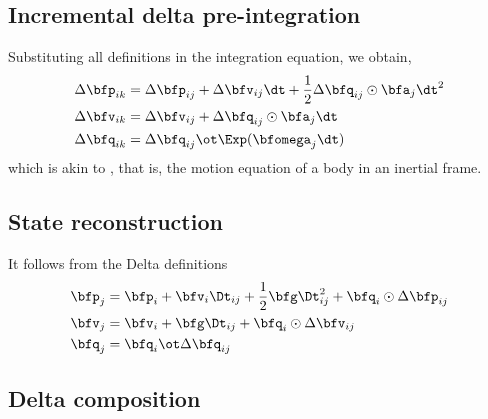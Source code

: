 \subsection{Incremental delta pre-integration}
%
Substituting all definitions in the integration equation, we obtain,
%
\begin{align}\label{equ:g_second_order_pre-integration}
\begin{split}
\Dp_{ik} 
&= \Dp_{ij} + \Dv_{ij}\dt + \frac12\Dq_{ij}\od\bfa_j\dt^2 \\
\Dv_{ik} 
&= \Dv_{ij} + \Dq_{ij}\od\bfa_j\dt \\
\Dq_{ik} 
&= \Dq_{ij}\ot\Exp(\bw_j\dt) 
\end{split}
\end{align}
%
which is akin to , that is, the motion equation of a body in an inertial frame.



\subsection{State reconstruction}

It follows from the Delta definitions
%
\begin{align}
\begin{split}
\bfp_j &= \bfp_i + \bfv_i\Dt_{ij} + \frac12\bfg\Dt_{ij}^2 + \bfq_i\od\Dp_{ij} \\
\bfv_j &= \bfv_i + \bfg\Dt_{ij} + \bfq_i\od\Dv_{ij} \\
\bfq_j &= \bfq_i\ot\Dq_{ij}   
\end{split}
\end{align}

\subsection{Delta composition}

